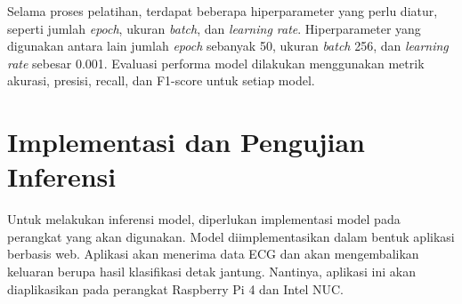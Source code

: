 Selama proses pelatihan, terdapat beberapa hiperparameter yang perlu diatur, seperti jumlah \textit{epoch}, ukuran \textit{batch}, dan \textit{learning rate}.
Hiperparameter yang digunakan antara lain jumlah \textit{epoch} sebanyak 50, ukuran \textit{batch} 256, dan \textit{learning rate} sebesar 0.001.
Evaluasi performa model dilakukan menggunakan metrik akurasi, presisi, recall, dan F1-score untuk setiap model.


\section{Implementasi dan Pengujian Inferensi}
\label{subsec: metodologi-implementasi}

Untuk melakukan inferensi model, diperlukan implementasi model pada perangkat yang akan digunakan.
Model diimplementasikan dalam bentuk aplikasi berbasis web.
Aplikasi akan menerima data ECG dan akan mengembalikan keluaran berupa hasil klasifikasi detak jantung.
Nantinya, aplikasi ini akan diaplikasikan pada perangkat Raspberry Pi 4 dan Intel NUC.


